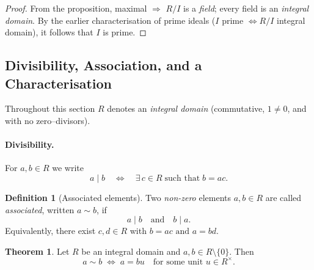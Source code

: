 \documentclass[12pt]{article}
\theoremstyle{definition} %
\newtheorem{theorem}{Theorem}
\newtheorem{definition}{Definition}
\theoremstyle{plain} %
\begin{document}
\begin{proof}
  From the proposition, maximal \(\Longrightarrow\) \(R/I\) is a \emph{field};
  every field is an \emph{integral domain}.  
  By the earlier characterisation of prime ideals
  (\(I\) prime \(\Longleftrightarrow R/I\) integral domain),
  it follows that \(I\) is prime.
\end{proof}
\subsection*{Divisibility, Association, and a Characterisation}

Throughout this section \(R\) denotes an \emph{integral domain}  
(commutative, \(1\neq0\), and with no zero–divisors).

\paragraph{Divisibility.}
For \(a,b\in R\) we write
\[
   a\mid b
   \quad\Longleftrightarrow\quad
   \exists\,c\in R\;\text{such that}\; b = ac .
\]

\begin{definition}[Associated elements]
  Two \emph{non-zero} elements \(a,b\in R\) are called \emph{associated},
  written \(a\sim b\), if
  \[
      a\mid b
      \quad\text{and}\quad
      b\mid a .
  \]
  Equivalently, there exist \(c,d\in R\) with
  \(
     b = ac
     \text{ and }
     a = bd .
  \)
\end{definition}

\begin{theorem}
  Let \(R\) be an integral domain and \(a,b\in R\setminus\{0\}\).  
  Then
  \[
     a \sim b
     \;\Longleftrightarrow\;
     a = bu
     \quad\text{for some unit }u\in R^{\times}.
  \]
\end{theorem}
\end{document}
